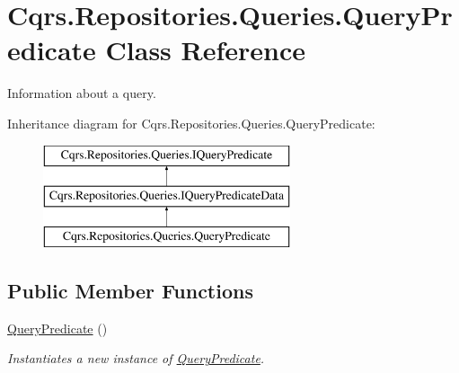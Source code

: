 \hypertarget{classCqrs_1_1Repositories_1_1Queries_1_1QueryPredicate}{}\section{Cqrs.\+Repositories.\+Queries.\+Query\+Predicate Class Reference}
\label{classCqrs_1_1Repositories_1_1Queries_1_1QueryPredicate}


Information about a query.  


Inheritance diagram for Cqrs.\+Repositories.\+Queries.\+Query\+Predicate\+:\begin{figure}[H]
\begin{center}
\leavevmode
\includegraphics[height=3.000000cm]{classCqrs_1_1Repositories_1_1Queries_1_1QueryPredicate}
\end{center}
\end{figure}
\subsection*{Public Member Functions}
\begin{DoxyCompactItemize}
\item 
\hyperlink{classCqrs_1_1Repositories_1_1Queries_1_1QueryPredicate_ab690c78e98470fe4e219380db1c0e52c_ab690c78e98470fe4e219380db1c0e52c}{Query\+Predicate} ()
\begin{DoxyCompactList}\small\item\em Instantiates a new instance of \hyperlink{classCqrs_1_1Repositories_1_1Queries_1_1QueryPredicate}{Query\+Predicate}. \end{DoxyCompactList}\end{DoxyCompactItemize}
